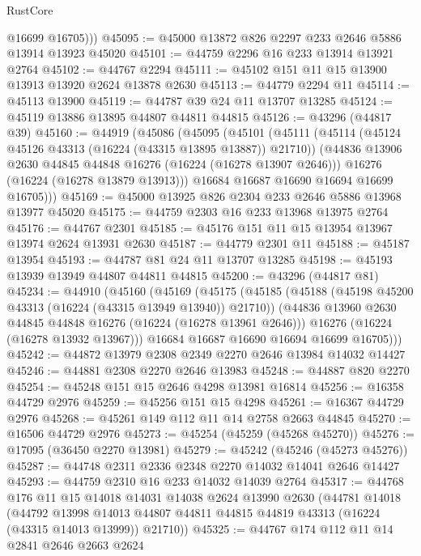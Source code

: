 \begin{lexlean}{RustCore}
\begin{coremodule}
          @16699
          @16705)))
@45095 := @45000 @13872 @826 @2297 @233 @2646 @5886 @13914 @13923 @45020
@45101 := @44759 @2296 @16 @233 @13914 @13921 @2764
@45102 := @44767 @2294
@45111 := @45102 @151 @11 @15 @13900 @13913 @13920 @2624 @13878 @2630
@45113 := @44779 @2294 @11
@45114 := @45113 @13900
@45119 := @44787 @39 @24 @11 @13707 @13285
@45124 := @45119 @13886 @13895 @44807 @44811 @44815
@45126 := @43296 (@44817 @39)
@45160 := @44919
    (@45086
      (@45095
        (@45101
          (@45111
            (@45114 (@45124 @45126 @43313 (@16224 (@43315 @13895 @13887)) @21710))
            (@44836 @13906 @2630 @44845 @44848 @16276 (@16224 (@16278 @13907 @2646)))
            @16276
            (@16224 (@16278 @13879 @13913)))
          @16684
          @16687
          @16690
          @16694
          @16699
          @16705)))
@45169 := @45000 @13925 @826 @2304 @233 @2646 @5886 @13968 @13977 @45020
@45175 := @44759 @2303 @16 @233 @13968 @13975 @2764
@45176 := @44767 @2301
@45185 := @45176 @151 @11 @15 @13954 @13967 @13974 @2624 @13931 @2630
@45187 := @44779 @2301 @11
@45188 := @45187 @13954
@45193 := @44787 @81 @24 @11 @13707 @13285
@45198 := @45193 @13939 @13949 @44807 @44811 @44815
@45200 := @43296 (@44817 @81)
@45234 := @44910
    (@45160
      (@45169
        (@45175
          (@45185
            (@45188 (@45198 @45200 @43313 (@16224 (@43315 @13949 @13940)) @21710))
            (@44836 @13960 @2630 @44845 @44848 @16276 (@16224 (@16278 @13961 @2646)))
            @16276
            (@16224 (@16278 @13932 @13967)))
          @16684
          @16687
          @16690
          @16694
          @16699
          @16705)))
@45242 := @44872 @13979 @2308 @2349 @2270 @2646 @13984 @14032 @14427
@45246 := @44881 @2308 @2270 @2646 @13983
@45248 := @44887 @820 @2270
@45254 := @45248 @151 @15 @2646 @4298 @13981 @16814
@45256 := @16358 @44729 @2976
@45259 := @45256 @151 @15 @4298
@45261 := @16367 @44729 @2976
@45268 := @45261 @149 @112 @11 @14 @2758 @2663 @44845
@45270 := @16506 @44729 @2976
@45273 := @45254 (@45259 (@45268 @45270))
@45276 := @17095 (@36450 @2270 @13981)
@45279 := @45242 (@45246 (@45273 @45276))
@45287 := @44748 @2311 @2336 @2348 @2270 @14032 @14041 @2646 @14427
@45293 := @44759 @2310 @16 @233 @14032 @14039 @2764
@45317 := @44768
    @176
    @11
    @15
    @14018
    @14031
    @14038
    @2624
    @13990
    @2630
    (@44781
      @14018
      (@44792
        @13998
        @14013
        @44807
        @44811
        @44815
        @44819
        @43313
        (@16224 (@43315 @14013 @13999))
        @21710))
@45325 := @44767 @174 @112 @11 @14 @2841 @2646 @2663 @2624

\end{coremodule}
\end{lexlean}

